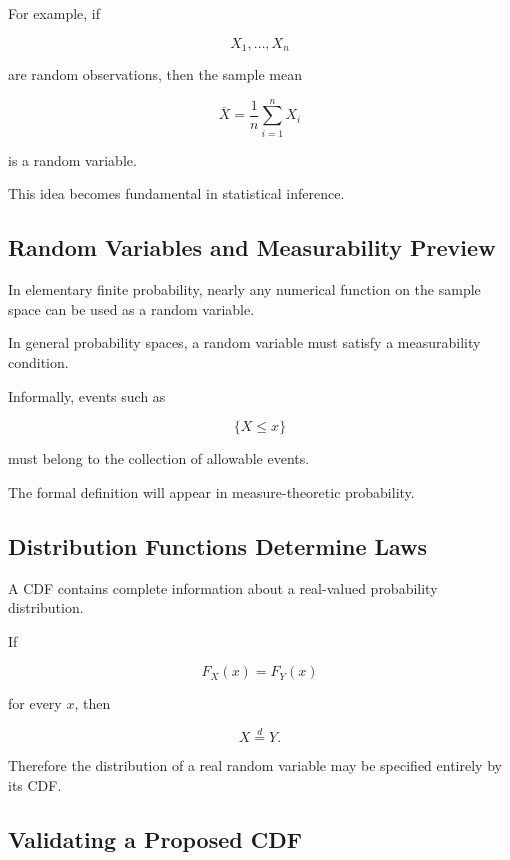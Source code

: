 For example, if

\[
X_1,\ldots,X_n
\]

are random observations, then the sample mean

\[
\overline{X}
=
\frac1n
\sum_{i=1}^{n}X_i
\]

is a random variable.

This idea becomes fundamental in statistical inference.

\subsection{Random Variables and Measurability Preview}
\label{subsec:rv-measurability-preview}

In elementary finite probability, nearly any numerical function on the
sample space can be used as a random variable.

In general probability spaces, a random variable must satisfy a
measurability condition.

Informally, events such as

\[
\{X\leq x\}
\]

must belong to the collection of allowable events.

The formal definition will appear in measure-theoretic probability.

\subsection{Distribution Functions Determine Laws}
\label{subsec:cdf-determines-law}

A CDF contains complete information about a real-valued probability
distribution.

If

\[
F_X(x)=F_Y(x)
\]

for every \(x\), then

\[
\boxed{
X\overset{d}{=}Y.
}
\]

Therefore the distribution of a real random variable may be specified
entirely by its CDF.

\subsection{Validating a Proposed CDF}
\label{subsec:validating-cdf}


